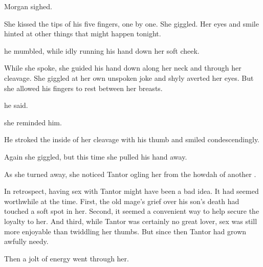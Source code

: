 Morgan sighed. 

She kissed the tips of his five fingers, one by one. 
She giggled. 
Her eyes and smile hinted at other things that might happen  tonight. 

 he mumbled, while idly running his hand down her soft cheek. 

While she spoke, she guided his hand down along her neck and through her cleavage. 
She giggled at her own unspoken joke and shyly averted her eyes. 
But she allowed his fingers to rest between her breasts. 

 he said. 

 she reminded him. 

He stroked the inside of her cleavage with his thumb and smiled condescendingly. 

Again she giggled, but this time she pulled his hand away. 

As she turned away, she noticed \Jirad{} Tantor ogling her from the howdah of another \mulgron. 


In retrospect, having sex with Tantor might have been a bad idea. 
It had seemed worthwhile at the time. 
First, the old mage's grief over his son's death had touched a soft spot in her. 
Second, it seemed a convenient way to help secure the \ishrahz{} loyalty to her. 
And third, while Tantor was certainly no great lover, sex was still more enjoyable than twiddling her thumbs. 
But since then Tantor had grown awfully needy. 

Then a jolt of energy went through her. 

